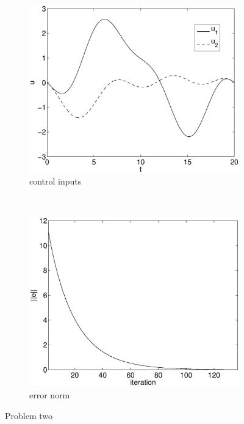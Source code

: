 \begin{figure}[h]
\begin{subfigure}[b]{0.45\textwidth}
\centering
\includegraphics[width=\textwidth]{img/manip_pltf_task_u.eps}
\caption{control inputs}
\end{subfigure}
~
\begin{subfigure}[b]{0.45\textwidth}
\centering
\includegraphics[width=\textwidth]{img/manip_pltf_task_err.eps}
\caption{error norm}
\end{subfigure}
\caption{Problem two}
\label{fig:pr2}
\end{figure}